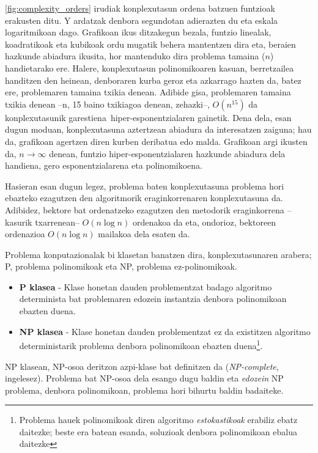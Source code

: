\documentclass[eu]{ifirak}\usepackage[]{graphicx}\usepackage[]{color}
\newcommand{\zkk}{\guillemotleft}
\newcommand{\skk}{\guillemotright}
\begin{document}
\ref{fig:complexity_orders} irudiak konplexutasun ordena batzuen funtzioak erakusten ditu. Y ardatzak denbora segundotan adierazten du eta eskala logaritmikoan dago. Grafikoan ikus ditzakegun bezala, funtzio linealak, koadratikoak eta kubikoak ordu mugatik behera mantentzen dira eta, beraien hazkunde abiadura ikusita, hor mantenduko dira problema tamaina ($n$) handietarako ere. Halere, konplexutasun polinomikoaren kasuan, berretzailea handitzen den heinean, denboraren kurba  geroz eta azkarrago hazten da, batez ere, problemaren tamaina txikia denean. Adibide gisa, problemaren tamaina txikia denean --n, 15 baino txikiagoa denean, zehazki--, $O(n^{15})$ da konplexutasunik \zkk garestiena\skk\, hiper-esponentzialaren gainetik. Dena dela, esan dugun moduan, konplexutasuna aztertzean abiadura da interesatzen zaiguna; hau da, grafikoan agertzen diren kurben deribatua edo malda. Grafikoan argi ikusten da, $n\rightarrow \infty$ denean, funtzio hiper-esponentzialaren hazkunde abiadura dela handiena, gero esponentzialarena eta polinomikoena.

Hasieran esan dugun legez, problema baten konplexutasuna problema hori ebazteko ezagutzen den algoritmorik eraginkorrenaren konplexutasuna da. Adibidez, bektore bat ordenatzeko ezagutzen den metodorik eraginkorrena --kasurik txarrenean-- $O(n\log n)$ ordenakoa da eta, ondorioz, bektoreen ordenazioa $O(n\log n)$ mailakoa dela esaten da.

Problema konputazionalak bi klasetan banatzen dira, konplexutasunaren arabera; P, problema polinomikoak eta NP, problema ez-polinomikoak.

\begin{itemize}
\item \textbf{P klasea} - Klase honetan dauden problementzat badago algoritmo determinista bat problemaren edozein instantzia denbora polinomikoan ebazten duena.
\item \textbf{NP klasea} - Klase honetan dauden problementzat ez da existitzen algoritmo deterministarik problema denbora polinomikoan ebazten duena\footnote{Problema hauek polinomikoak diren algoritmo \textit{estokastikoak} erabiliz ebatz daitezke; beste era batean esanda, soluzioak denbora polinomikoan ebalua daitezke}.
\end{itemize}

NP klasean, NP-osoa deritzon azpi-klase bat definitzen da (\textit{NP-complete}, ingelesez). Problema bat NP-osoa dela esango dugu baldin eta \textit{edozein} NP problema, denbora polinomikoan, problema hori bihurtu baldin badaiteke.
\end{document}

